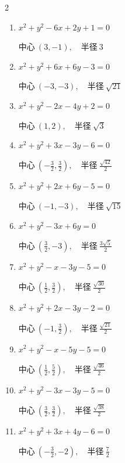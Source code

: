 \begin{multicols}{2}
\begin{enumerate}
  \item $x^{2}+y^{2}-6x+2y+1=0$

        $\displaystyle 中心\: \left(3,-1\right), \quad 半径 \ 3$

  \item $x^{2}+y^{2}+6x+6y-3=0$

        $\displaystyle 中心\: \left(-3,-3\right), \quad 半径 \ \sqrt{21}$

\columnbreak %

  \item $x^{2}+y^{2}-2x-4y+2=0$

        $\displaystyle 中心\: \left(1,2\right), \quad 半径 \ \sqrt{3}$

  \item $x^{2}+y^{2}+3x-3y-6=0$

        $\displaystyle 中心\: \left(-\frac{3}{2},\frac{3}{2}\right), \quad 半径 \ \frac{\sqrt{42}}{2}$

  \item $x^{2}+y^{2}+2x+6y-5=0$

        $\displaystyle 中心\: \left(-1,-3\right), \quad 半径 \ \sqrt{15}$

  \item $x^{2}+y^{2}-3x+6y=0$

        $\displaystyle 中心\: \left(\frac{3}{2},-3\right), \quad 半径 \ \frac{3\sqrt{5}}{2}$

  \item $x^{2}+y^{2}-x-3y-5=0$

        $\displaystyle 中心\: \left(\frac{1}{2},\frac{3}{2}\right), \quad 半径 \ \frac{\sqrt{30}}{2}$

  \item $x^{2}+y^{2}+2x-3y-2=0$

        $\displaystyle 中心\: \left(-1,\frac{3}{2}\right), \quad 半径 \ \frac{\sqrt{21}}{2}$

  \item $x^{2}+y^{2}-x-5y-5=0$

        $\displaystyle 中心\: \left(\frac{1}{2},\frac{5}{2}\right), \quad 半径 \ \frac{\sqrt{46}}{2}$

  \item $x^{2}+y^{2}-3x-3y-5=0$

        $\displaystyle 中心\: \left(\frac{3}{2},\frac{3}{2}\right), \quad 半径 \ \frac{\sqrt{38}}{2}$

  \item $x^{2}+y^{2}+3x+4y-6=0$

        $\displaystyle 中心\: \left(-\frac{3}{2},-2\right), \quad 半径 \ \frac{7}{2}$


\end{enumerate}
\end{multicols}
